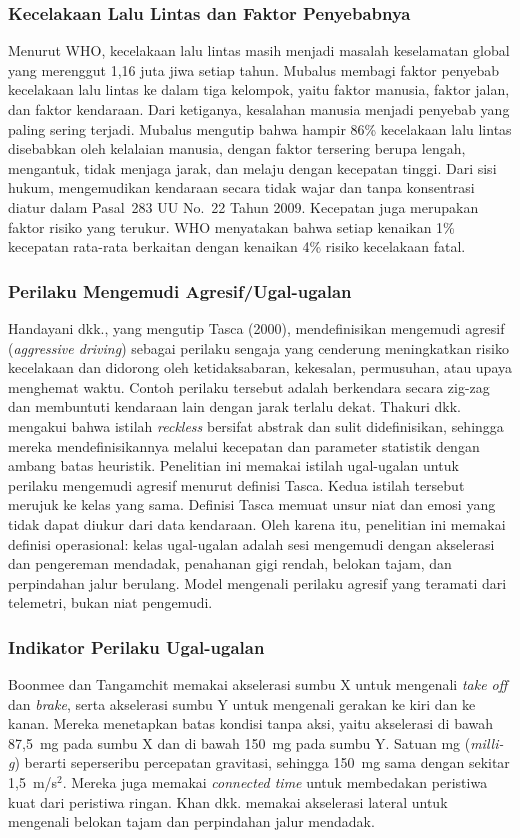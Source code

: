 \subsubsection{Kecelakaan Lalu Lintas dan Faktor Penyebabnya}
Menurut WHO, kecelakaan lalu lintas masih menjadi masalah keselamatan global yang merenggut 1,16 juta jiwa setiap tahun. Mubalus membagi faktor penyebab kecelakaan lalu lintas ke dalam tiga kelompok, yaitu faktor manusia, faktor jalan, dan faktor kendaraan. Dari ketiganya, kesalahan manusia menjadi penyebab yang paling sering terjadi. Mubalus mengutip bahwa hampir 86\% kecelakaan lalu lintas disebabkan oleh kelalaian manusia, dengan faktor tersering berupa lengah, mengantuk, tidak menjaga jarak, dan melaju dengan kecepatan tinggi. Dari sisi hukum, mengemudikan kendaraan secara tidak wajar dan tanpa konsentrasi diatur dalam Pasal~283 UU No.~22 Tahun 2009. Kecepatan juga merupakan faktor risiko yang terukur. WHO menyatakan bahwa setiap kenaikan 1\% kecepatan rata-rata berkaitan dengan kenaikan 4\% risiko kecelakaan fatal.

\subsubsection{Perilaku Mengemudi Agresif/Ugal-ugalan}
\label{subsec:agresif}
Handayani dkk., yang mengutip Tasca (2000), mendefinisikan mengemudi agresif (\textit{aggressive driving}) sebagai perilaku sengaja yang cenderung meningkatkan risiko kecelakaan dan didorong oleh ketidaksabaran, kekesalan, permusuhan, atau upaya menghemat waktu. Contoh perilaku tersebut adalah berkendara secara zig-zag dan membuntuti kendaraan lain dengan jarak terlalu dekat. Thakuri dkk. mengakui bahwa istilah \textit{reckless} bersifat abstrak dan sulit didefinisikan, sehingga mereka mendefinisikannya melalui kecepatan dan parameter statistik dengan ambang batas heuristik. Penelitian ini memakai istilah ugal-ugalan untuk perilaku mengemudi agresif menurut definisi Tasca. Kedua istilah tersebut merujuk ke kelas yang sama. Definisi Tasca memuat unsur niat dan emosi yang tidak dapat diukur dari data kendaraan. Oleh karena itu, penelitian ini memakai definisi operasional: kelas ugal-ugalan adalah sesi mengemudi dengan akselerasi dan pengereman mendadak, penahanan gigi rendah, belokan tajam, dan perpindahan jalur berulang. Model mengenali perilaku agresif yang teramati dari telemetri, bukan niat pengemudi.

\subsubsection{Indikator Perilaku Ugal-ugalan}
Boonmee dan Tangamchit memakai akselerasi sumbu X untuk mengenali \textit{take off} dan \textit{brake}, serta akselerasi sumbu Y untuk mengenali gerakan ke kiri dan ke kanan. Mereka menetapkan batas kondisi tanpa aksi, yaitu akselerasi di bawah 87,5~mg pada sumbu X dan di bawah 150~mg pada sumbu Y. Satuan mg (\textit{milli-g}) berarti seperseribu percepatan gravitasi, sehingga 150~mg sama dengan sekitar 1,5~m/s$^{2}$. Mereka juga memakai \textit{connected time} untuk membedakan peristiwa kuat dari peristiwa ringan. Khan dkk. memakai akselerasi lateral untuk mengenali belokan tajam dan perpindahan jalur mendadak.

